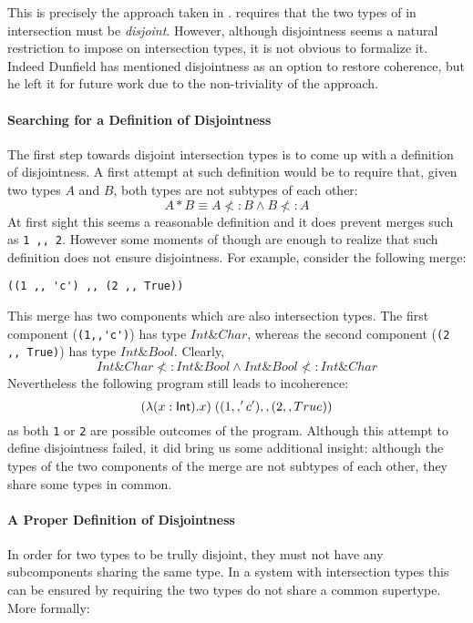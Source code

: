 This is precisely the approach taken in \name. \name requires that the
two types of in intersection must be \emph{disjoint}.  However,
although disjointness seems a natural restriction to impose on
intersection types, it is not obvious to formalize it. Indeed Dunfield
has mentioned disjointness as an option to restore coherence, but he
left it for future work due to the non-triviality of the approach.

\paragraph{Searching for a Definition of Disjointness}
The first step towards disjoint intersection types is to come up
with a definition of disjointness. A first attempt at such definition would
be to require that, given two types $A$ and $B$, both types are not
subtypes of each other: 
\[A * B \equiv A \not<: B \wedge B \not<: A\]
At first sight this seems a reasonable definition and it does prevent 
merges such as \lstinline{1 ,, 2}. However some moments of though are enough to realize that 
such definition does not ensure disjointness. For example, consider
the following merge:

\begin{lstlisting}
((1 ,, 'c') ,, (2 ,, True))
\end{lstlisting}

\noindent This merge has two components which are also intersection
types. The first component (\lstinline{(1,,'c')}) has type $Int \&
Char$, whereas the second component (\lstinline{(2 ,, True)}) has type 
$Int \& Bool$. Clearly,
\[Int \& Char \not<: Int \& Bool \wedge Int \& Bool \not<: Int \& Char\]
Nevertheless the following program still leads to
incoherence:
\[ (\lambda (x : \textsf{Int}). x) \; ((1 ,, 'c') ,, (2 ,, True)) \]
as both \lstinline{1} or \lstinline{2} are possible outcomes
of the program. Although this attempt to define disjointness failed, 
it did bring us some additional insight: although the types of the two 
components of the merge are not subtypes of each other, they share 
some types in common. 

\paragraph{A Proper Definition of Disjointness} In order for two types
to be trully disjoint, they must not have any subcomponents sharing
the same type. In a system with intersection types this can be ensured 
by requiring the two types do not share a common supertype. More 
formally:

